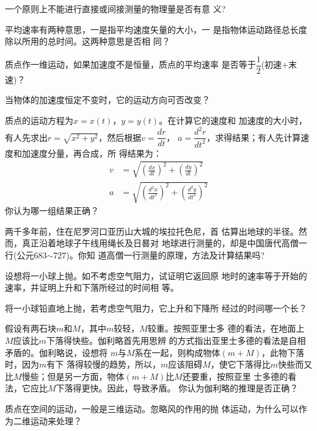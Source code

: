\questions
\fangsong
\question 一个原则上不能进行直接或间接测量的物理量是否有意
义?

\question 平均速率有两种意思，一是指平均速度矢量的大小，一
是指物体运动路径总长度除以所用的总时间。这两种意思是否相
同？

\question 质点作一维运动，如果加速度不是恒量，质点的平均速率
是否等于$\dfrac 1 2$(初速+末速)？

\question 当物体的加速度恒定不变时，它的运动方向可否改变？

\question 质点的运动方程为$x=x(t)$，$y=y(t)$。在计算它的速度和
加速度的大小时，有人先求出$r=\sqrt{x^2+y^2}$，然后根据$v=\dfrac{dr}{dt}$，
$a=\dfrac{d^2r}{dt^2}$，求得结果；有人先计算速度和加速度分量，再合成，所
得结果为：
\begin{equation*}
    \begin{aligned}
        v &=\sqrt{\left(\frac{d x}{d t}\right)^{2}+\left(\frac{d y}{d t}\right)^{2}} \\
        a &=\sqrt{\left(\frac{d^{2} x}{d t^{2}}\right)^{2}+\left(\frac{d^{2} y}{d t^{2}}\right)^{2}}
    \end{aligned}
\end{equation*}
你认为哪一组结果正确？

\question  两千多年前，住在尼罗河口亚历山大城的埃拉托色尼，首
估算出地球的半径。然而，真正沿着地球子午线用绳长及日晷对
地球进行测量的，却是中国唐代高僧一行(公元683$\sim$727)。你知
道高僧一行测量的原理，方法及计算结果吗?

\question  设想将一小球上抛。如不考虑空气阻力，试证明它返回原
地时的速率等于开始的速率，并证明上升和下落所经过的时间相
等。

\question  将一小球铅直地上抛，若考虑空气阻力，它上升和下降所
经过的时间哪一个长？

\question  假设有两石块$m$和$M$，其中$m$较轻，$M$较重。按照亚里士多
德的看法，在地面上$M$应该比$m$下落得快些。伽利略首先用思辨
的方式指出亚里士多德的看法是自相矛盾的。伽利略说，设想将
$m$与$M$系在一起，则构成物体$(m+M)$，此物下落时，因为$m$有下
落得较慢的趋势，所以，$m$应该阻碍$M$，使它下落得比$m$快些而又
比$M$慢些；但是另一方面，物体$(m+M)$比$M$还要重，按照亚里
士多德的看法，它应比$M$下落得更快。因此，导致矛盾。
你认为伽利略的推理是否正确？

\question  质点在空间的运动，一般是三维运动。忽略风的作用的抛
体运动，为什么可以作为二维运动来处理？
\normalfont
